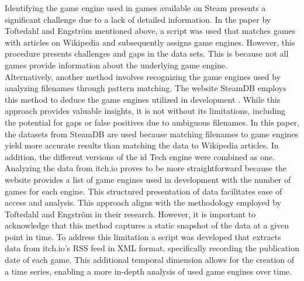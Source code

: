 Identifying the game engine used in games available on Steam presents a significant challenge due to a lack of detailed information.
In the paper by Toftedahl and Engström mentioned above, a script was used that matches games with articles on Wikipedia and subsequently assigns game engines.
However, this procedure presents challenges and gaps in the data sets.
This is because not all games provide information about the underlying game engine. \\

Alternatively, another method involves recognizing the game engines used by analyzing filenames through pattern matching.
The website SteamDB employs this method to deduce the game engines utilized in development \cite{steamdb-tech}.
While this approach provides valuable insights, it is not without its limitations, including the potential for gaps or false positives due to ambiguous filenames.
In this paper, the datasets from SteamDB are used because matching filenames to game engines yield more accurate results than matching the data to Wikipedia articles.
In addition, the different versions of the id Tech engine were combined as one. \\

Analyzing the data from itch.io proves to be more straightforward because the website provides a list of game engines used in development with the number of games for each engine. %
This structured presentation of data facilitates ease of access and analysis.
This approach aligns with the methodology employed by Toftedahl and Engström in their research.
However, it is important to acknowledge that this method captures a static snapshot of the data at a given point in time.
To address this limitation a script was developed that extracts data from itch.io's RSS feed in XML format, specifically recording the publication date of each game.
This additional temporal dimension allows for the creation of a time series, enabling a more in-depth analysis of used game engines over time.
